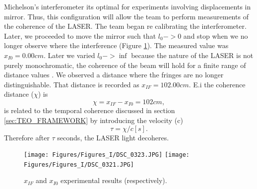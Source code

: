 Michelson's interferometer its optimal for experiments involving displacements in mirror. Thus, this configuration will allow the team to perform measurements of the coherence of the LASER. The team began re calibrating the interferometer. Later, we proceeded to move the mirror such that $l_0 -> 0$ and stop when we no longer observe where the interference (Figure \ref{fig:MichRes}). The measured value was $x_{I0} =0.00 cm $. Later we varied $l_0 -> \inf$ because the nature of the LASER is not purely monochromatic, the coherence of the beam will hold for a finite range of distance values . We observed a distance where the fringes are no longer distinguishable. That distance is recorded as $x_{IF} =102.00 cm $. E.i the coherence distance ($\chi$) is 
\begin{equation} 
\chi = x_{IF} - x_{I0} = 102 cm, 
\end{equation} 
is related to the temporal coherence discussed in section \ref{sec:TEO_FRAMEWORK} by introducing the velocity (c)
\begin{equation} 
\tau = \chi / c [s]. 
\end{equation} 
Therefore after $\tau$ seconds, the LASER light decoheres. 
\begin{figure} [H]
    \texttt{[image: Figures/Figures\_I/DSC\_0323.JPG]}\hfill
    \texttt{[image: Figures/Figures\_I/DSC\_0321.JPG]}\hfill
    \caption{$x_{IF}$ and $x_{I0}$ experimental results (respectively). }
    \label{fig:MichRes}
\end{figure}




